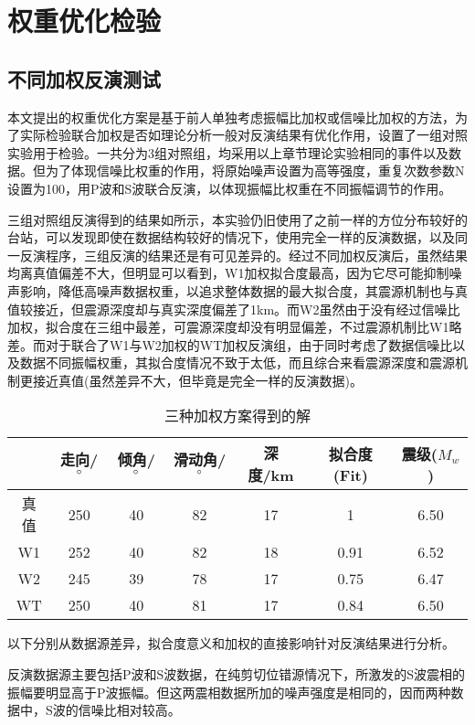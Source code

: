 \section{权重优化检验}

\subsection{不同加权反演测试}
本文提出的权重优化方案是基于前人单独考虑振幅比加权或信噪比加权的方法，为了实际检验联合加权是否如理论分析一般对反演结果有优化作用，设置了一组对照实验用于检验。一共分为3组对照组，均采用以上章节理论实验相同的事件以及数据。但为了体现信噪比权重的作用，将原始噪声设置为高等强度，重复次数参数N设置为100，用P波和S波联合反演，以体现振幅比权重在不同振幅调节的作用。

三组对照组反演得到的结果如所示，本实验仍旧使用了之前一样的方位分布较好的台站，可以发现即使在数据结构较好的情况下，使用完全一样的反演数据，以及同一反演程序，三组反演的结果还是有可见差异的。经过不同加权反演后，虽然结果均离真值偏差不大，但明显可以看到，W1加权拟合度最高，因为它尽可能抑制噪声影响，降低高噪声数据权重，以追求整体数据的最大拟合度，其震源机制也与真值较接近，但震源深度却与真实深度偏差了1km。而W2虽然由于没有经过信噪比加权，拟合度在三组中最差，可震源深度却没有明显偏差，不过震源机制比W1略差。而对于联合了W1与W2加权的WT加权反演组，由于同时考虑了数据信噪比以及数据不同振幅权重，其拟合度情况不致于太低，而且综合来看震源深度和震源机制更接近真值(虽然差异不大，但毕竟是完全一样的反演数据)。
\begin{table}[ht]
\centering
\caption{三种加权方案得到的解}
\label{tab3_01}
    \begin{tabular}{c c c c c c c}
    \hline
     & 走向/$^\circ$ & 倾角/$^\circ$ & 滑动角/$^\circ$ & 深度/km & 拟合度(Fit) & 震级($M_w$)\\
    \hline
    真值	& 250 & 40 & 82 & 17 & 1	& 6.50\\
    W1		& 252 & 40 & 82 & 18 & 0.91 & 6.52\\
    W2		& 245 & 39 & 78 & 17 & 0.75 & 6.47\\
    WT		& 250 & 40 & 81 & 17 & 0.84 & 6.50\\
    \hline
    \end{tabular}
\end{table}

以下分别从数据源差异，拟合度意义和加权的直接影响针对反演结果进行分析。

反演数据源主要包括P波和S波数据，在纯剪切位错源情况下，所激发的S波震相的振幅要明显高于P波振幅。但这两震相数据所加的噪声强度是相同的，因而两种数据中，S波的信噪比相对较高。

